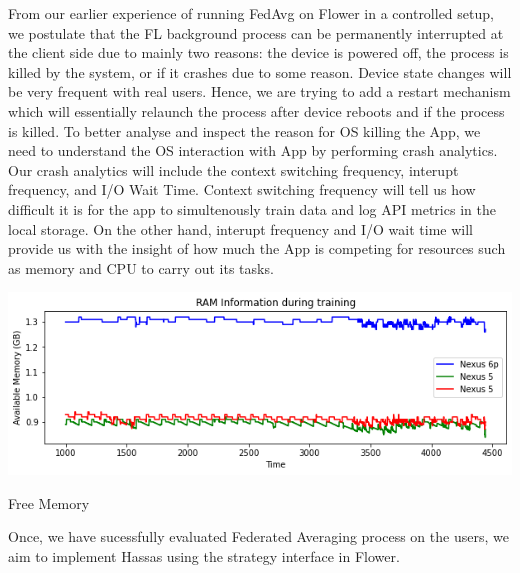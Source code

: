     From our earlier experience of running FedAvg on Flower in a controlled setup, we postulate that the FL background process can be permanently interrupted at the client side due to mainly two reasons: the device is powered off, the process is killed by the system, or if it crashes due to some reason. Device state changes will be very frequent with real users. Hence, we are trying to add a restart mechanism which will essentially relaunch the process after device reboots and if the process is killed. To better analyse and inspect the reason for OS killing the App, we need to understand the OS interaction with App by performing crash analytics. Our crash analytics will include the context switching frequency, interupt frequency, and I/O Wait Time. Context switching frequency will tell us how difficult it is for the app to simultenously train data and log API metrics in the local storage. On the other hand, interupt frequency and I/O wait time will provide us with the insight of how much the App is competing for resources such as memory and CPU to carry out its tasks. \\

    \begin{table}[h]
        \includegraphics[scale=0.38]{freemem}
        \caption{Free Memory}
    \end{table}
    
    Once, we have sucessfully evaluated Federated Averaging process on the users, we aim to implement Hassas using the strategy interface in Flower.

